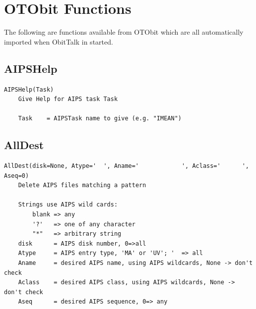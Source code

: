 \documentclass[11pt]{report}
\begin{document}

\section {OTObit Functions}
The following are functions available from OTObit which are all
automatically imported when ObitTalk in started.

\subsection{AIPSHelp}
\begin{verbatim}
AIPSHelp(Task)
    Give Help for AIPS task Task
    
    Task    = AIPSTask name to give (e.g. "IMEAN")
\end{verbatim}

\subsection{AllDest}
\begin{verbatim}
AllDest(disk=None, Atype='  ', Aname='            ', Aclass='      ', Aseq=0)
    Delete AIPS files matching a pattern
    
    Strings use AIPS wild cards:
        blank => any
        '?'   => one of any character
        "*"   => arbitrary string
    disk      = AIPS disk number, 0=>all
    Atype     = AIPS entry type, 'MA' or 'UV'; '  => all
    Aname     = desired AIPS name, using AIPS wildcards, None -> don't check
    Aclass    = desired AIPS class, using AIPS wildcards, None -> don't check
    Aseq      = desired AIPS sequence, 0=> any
\end{verbatim}
\end{document}
